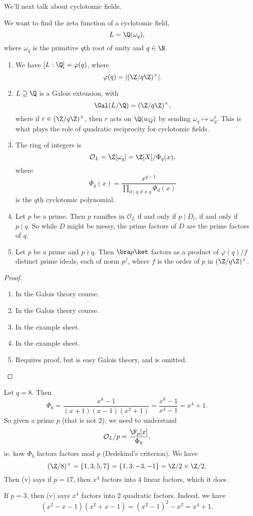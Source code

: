 \documentclass[a4paper]{article}
\begin{document}
We'll next talk about cyclotomic fields.

We want to find the zeta function of a cyclotomic field,
\[
  L = \Q(\omega_q),
\]
where $\omega_q$ is the primitive $q$th root of unity and $q\in \N$.
\begin{prop}\leavevmode
  \begin{enumerate}
    \item We have $[L:\Q] = \varphi(q)$, where
      \[
        \varphi(q) = |(\Z/q\Z)^\times|.
      \]
    \item $L \supseteq \Q$ is a Galois extension, with
      \[
        \Gal(L/\Q) = (\Z/q\Z)^\times,
      \]
      where if $r \in (\Z/q\Z)^\times$, then $r$ acts on $\Q(w_Q)$ by sending $\omega_q \mapsto \omega_q^r$. This is what plays the role of quadratic reciprocity for cyclotomic fields.
    \item The ring of integers is
      \[
        \mathcal{O}_L = \Z[\omega_q] = \Z[X]/\Phi_q(x),
      \]
      where
      \[
        \Phi_q(x) = \frac{x^{q - 1}}{\prod_{d \mid q, d \not= q}\Phi_d(x)}
      \]
      is the $q$th cyclotomic polynomial.
    \item Let $p$ be a prime. Then $p$ ramifies in $\mathcal{O}_L$ if and only if $p \mid D_l$, if and only if $p \mid q$. So while $D$ might be messy, the prime factors of $D$ are the prime factors of $q$.
    \item Let $p$ be a prime and $p \nmid q$. Then $\bra p\ket$ factors as a product of $\varphi(q)/f$ distinct prime ideals, each of norm $p^f$, where $f$ is the order of $p$ in $(\Z/q\Z)^{\times}$.
  \end{enumerate}
\end{prop}

\begin{proof}\leavevmode
  \begin{enumerate}
    \item In the Galois theory course.
    \item In the Galois theory course.
    \item In the example sheet.
    \item In the example sheet.
    \item Requires proof, but is easy Galois theory, and is omitted.
  \end{enumerate}
\end{proof}

\begin{eg}
  Let $q = 8$. Then
  \[
    \Phi_8 = \frac{x^8 - 1}{(x + 1)(x - 1)(x^2 + 1)} = \frac{x^8 - 1}{x^4 - 1} = x^4 + 1.
  \]
  So given a prime $p$ (that is not $2$), we need to understand
  \[
    \mathcal{O}_L/p = \frac{\F_p[x]}{\Phi_8},
  \]
  ie. how $\Phi_8$ factors factors mod $p$ (Dedekind's criterion). We have
  \[
    (\Z/8)^\times = \{1, 3, 5, 7\} = \{1, 3, -3, -1\} = \Z/2 \times \Z/2.
  \]
  Then (v) says if $p = 17$, then $x^4$ factors into $4$ linear factors, which it does.

  If $p = 3$, then (v) says $x^4$ factors into $2$ quadratic factors. Indeed, we have
  \[
    (x^2 - x - 1)(x^2 + x - 1) = (x^2 - 1)^2 - x^2 = x^4 + 1.
  \]
\end{eg}
\end{document}
